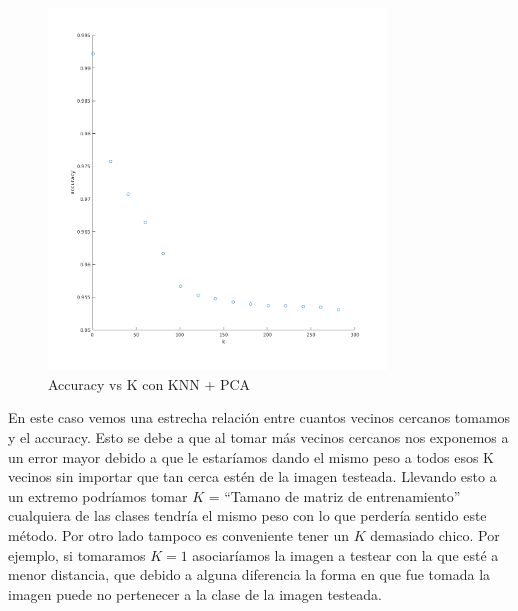 \begin{figure}[H]
	\centering
	\includegraphics[width=0.8\textwidth]{img/k_pca_accu.png}
	\caption{Accuracy vs K con KNN + PCA}
	\label{fig:K vs Accuracy con KNN + PCA}
\end{figure}

En este caso vemos una estrecha relación entre cuantos vecinos cercanos tomamos y el accuracy.
Esto se debe a que al tomar más vecinos cercanos nos exponemos a un error mayor debido a que le estaríamos dando el mismo peso a todos esos K vecinos sin importar que tan cerca estén de la imagen testeada.
Llevando esto a un extremo podríamos tomar $K$ = “Tamano de matriz de entrenamiento”  cualquiera de las clases tendría el mismo peso con lo que perdería sentido este método.
Por otro lado tampoco es conveniente tener un $K$ demasiado chico. Por ejemplo, si tomaramos $K = 1$ asociaríamos la imagen a testear con la que esté a menor distancia, que debido a alguna diferencia la forma en que fue tomada la imagen puede no pertenecer a la clase de la imagen testeada.



